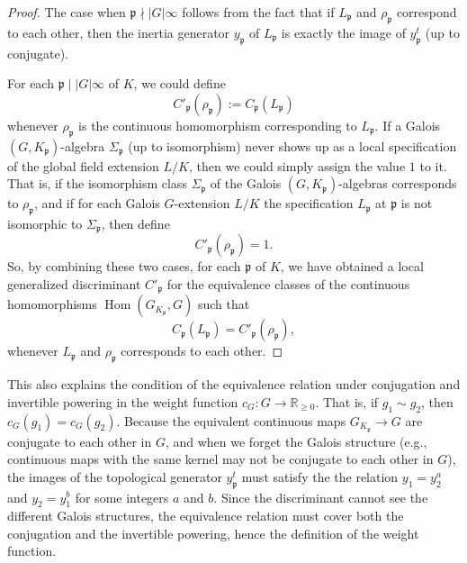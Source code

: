 \documentclass[12pt,a4paper]{amsart}
\numberwithin{equation}{section}%
\theoremstyle{plain}%
\theoremstyle{definition}%
\theoremstyle{remark}%
\begin{document}
	\begin{proof}
		The case when $\mathfrak{p}\nmid\lvert G\rvert\infty$ follows from the fact that if $L_{\mathfrak{p}}$ and $\rho_{\mathfrak{p}}$ correspond to each other, then the inertia generator $y_{\mathfrak{p}}$ of $L_{\mathfrak{p}}$ is exactly the image of $y_{\mathfrak{p}}^t$ (up to conjugate).
		
		For each $\mathfrak{p}\mid\lvert G\rvert\infty$ of $K$, we could define 
		\begin{equation*}
			C'_{\mathfrak{p}}(\rho_{\mathfrak{p}}):=C_{\mathfrak{p}}(L_{\mathfrak{p}})
		\end{equation*}
		whenever $\rho_{\mathfrak{p}}$ is the continuous homomorphism corresponding to $L_{\mathfrak{p}}$.		
		If a Galois $(G,K_{\mathfrak{p}})$-algebra $\Sigma_{\mathfrak{p}}$ (up to isomorphism) never shows up as a local specification of the global field extension $L/K$, then we could simply assign the value $1$ to it.
		That is, if the isomorphism class $\Sigma_{\mathfrak{p}}$ of the Galois $(G,K_{\mathfrak{p}})$-algebras corresponds to $\rho_{\mathfrak{p}}$, and if for each Galois $G$-extension $L/K$ the specification $L_{\mathfrak{p}}$ at $\mathfrak{p}$ is not isomorphic to $\Sigma_{\mathfrak{p}}$, then define
		\begin{equation*}
			C'_{\mathfrak{p}}(\rho_{\mathfrak{p}})=1.
		\end{equation*}
		So, by combining these two cases, for each $\mathfrak{p}$ of $K$, we have obtained a local generalized discriminant $C'_{\mathfrak{p}}$ for the equivalence classes of the continuous homomorphisms $\operatorname{Hom}(G_{K_{\mathfrak{p}}},G)$ such that 
		\begin{equation*}
			C_{\mathfrak{p}}(L_{\mathfrak{p}})=C'_{\mathfrak{p}}(\rho_{\mathfrak{p}}),
		\end{equation*}
		whenever $L_{\mathfrak{p}}$ and $\rho_{\mathfrak{p}}$ corresponds to each other.		
	\end{proof}
	This also explains the condition of the equivalence relation under conjugation and invertible powering in the weight function $c_{G}:G\to\mathbb{R}_{\geq 0}$.
	That is, if $g_{1}\sim g_{2}$, then $c_{G}(g_{1})=c_{G}(g_{2})$.
	Because the equivalent continuous maps $G_{K_{\mathfrak{p}}}\to G$ are conjugate to each other in $G$, and when we forget the Galois structure (e.g., continuous maps with the same kernel may not be conjugate to each other in $G$), the images of the topological generator $y_{\mathfrak{p}}^t$ must satisfy the the relation $y_{1}=y_{2}^{a}$ and $y_{2}=y_{1}^{b}$ for some integers $a$ and $b$.
	Since the discriminant cannot see the different Galois structures, the equivalence relation must cover both the conjugation and the invertible powering, hence the definition of the weight function.
	
\end{document}
